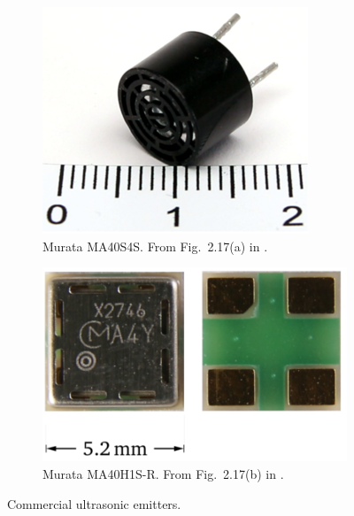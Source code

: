 \begin{figure}[!htb]
    \centering
    \begin{subfigure}{0.3\textwidth}
        \centering
        \includegraphics[width = \textwidth]{fig/20211226022137_resize.png}
        \caption{Murata MA40S4S. From Fig.~2.17(a) in \cite{Jager2019AirborneUltrasoundPhased}. }
    \end{subfigure}
    \qquad
    \begin{subfigure}{0.3\textwidth}
        \centering
        \includegraphics[width = \textwidth]{fig/20211226022344_resize.png}
        \caption{Murata MA40H1S-R. From Fig.~2.17(b) in \cite{Jager2019AirborneUltrasoundPhased}. }
    \end{subfigure}
    \caption{Commercial ultrasonic emitters.}
    \label{fig:flksdafsdf}
\end{figure}

